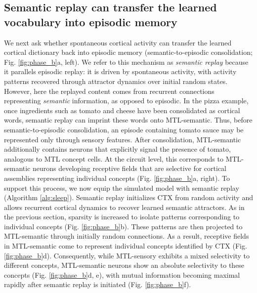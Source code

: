 \documentclass{article}
\begin{document}
\subsection*{Semantic replay can transfer the learned vocabulary into episodic memory}
We next ask whether spontaneous cortical activity can transfer the learned cortical dictionary back into episodic memory (semantic-to-episodic consolidation; Fig. \ref{fig:phase_b}a, left). We refer to this mechanism as \textit{semantic replay} because it parallels episodic replay: it is driven by spontaneous activity, with activity patterns recovered through attractor dynamics over initial random states. However, here the replayed content comes from recurrent connections representing \textit{semantic} information, as opposed to episodic. In the pizza example, once ingredients such as tomato and cheese have been consolidated as cortical words, semantic replay can imprint these words onto MTL-semantic. Thus, before semantic-to-episodic consolidation, an episode containing tomato sauce may be represented only through sensory features. After consolidation, MTL-semantic additionally contains neurons that explicitly signal the presence of tomato, analogous to MTL concept cells. At the circuit level, this corresponds to MTL-semantic neurons developing receptive fields that are selective for cortical assemblies representing individual concepts (Fig. \ref{fig:phase_b}a, right).
\newline\newline
To support this process, we now equip the simulated model with semantic replay (Algorithm \ref{alg:sleep}). Semantic replay initializes CTX from random activity and allows recurrent cortical dynamics to recover learned semantic attractors. As in the previous section, sparsity is increased to isolate patterns corresponding to individual concepts (Fig. \ref{fig:phase_b}b). These patterns are then projected to MTL-semantic through initially random connections. As a result, receptive fields in MTL-semantic come to represent individual concepts identified by CTX (Fig. \ref{fig:phase_b}d). Consequently, while MTL-sensory exhibits a mixed selectivity to different concepts, MTL-semantic neurons show an absolute selectivity to these concepts (Fig. \ref{fig:phase_b}d, e), with mutual information becoming maximal rapidly after semantic replay is initiated (Fig. \ref{fig:phase_b}f).
\newline\newline
\end{document}
